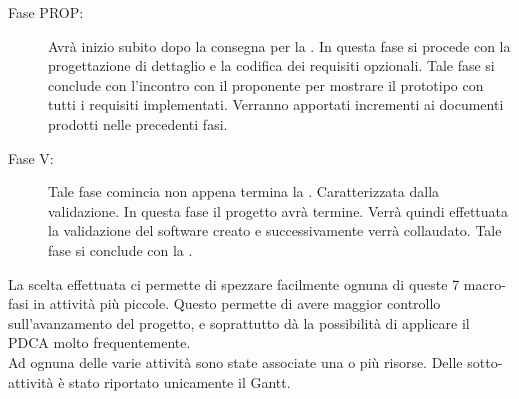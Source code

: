 \begin{description}
			\item[Fase PROP:] Avrà inizio subito dopo la consegna per la . In questa fase si procede con la progettazione di dettaglio e la codifica dei requisiti opzionali. Tale fase si conclude con l'incontro con il proponente per mostrare il prototipo con tutti i requisiti implementati. Verranno apportati incrementi ai documenti prodotti nelle precedenti fasi.
			\item[Fase V:] Tale fase comincia non appena termina la . Caratterizzata dalla validazione. In questa fase il progetto avrà termine. Verrà quindi effettuata la validazione del software creato e successivamente verrà collaudato. Tale fase si conclude con la .
		\end{description}
		La scelta effettuata ci permette di spezzare facilmente ognuna di queste 7 macro-fasi in attività più piccole. Questo permette di avere maggior controllo sull'avanzamento del progetto, e soprattutto dà la possibilità di applicare il PDCA molto frequentemente.\\Ad ognuna delle varie attività sono state associate una o più risorse. Delle sotto-attività è stato riportato unicamente il Gantt.
